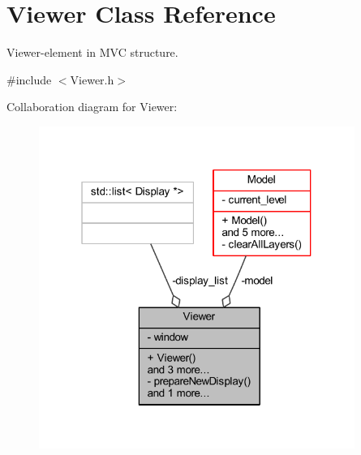\hypertarget{class_viewer}{}\section{Viewer Class Reference}
\label{class_viewer}


Viewer-\/element in M\+VC structure.  




{\ttfamily \#include $<$Viewer.\+h$>$}



Collaboration diagram for Viewer\+:\nopagebreak
\begin{figure}[H]
\begin{center}
\leavevmode
\includegraphics[width=292pt]{class_viewer__coll__graph}
\end{center}
\end{figure}

